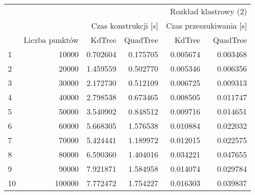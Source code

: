 \begin{tabular}{lrrrrr}
\toprule
 & \multicolumn{5}{r}{Rozkład klastrowy (2)} \\
 &  & \multicolumn{2}{r}{Czas konstrukcji [s]} & \multicolumn{2}{r}{Czas przeszukiwania [s]} \\
 & Liczba punktów & KdTree & QuadTree & KdTree & QuadTree \\
\midrule
1 & 10000 & 0.702604 & 0.175705 & 0.005674 & 0.003468 \\
2 & 20000 & 1.459559 & 0.502770 & 0.005346 & 0.006356 \\
3 & 30000 & 2.172730 & 0.512109 & 0.006725 & 0.009313 \\
4 & 40000 & 2.798538 & 0.673465 & 0.008505 & 0.011747 \\
5 & 50000 & 3.540902 & 0.848512 & 0.009716 & 0.014651 \\
6 & 60000 & 5.668305 & 1.576538 & 0.010884 & 0.022032 \\
7 & 70000 & 5.424441 & 1.189972 & 0.012015 & 0.022575 \\
8 & 80000 & 6.590360 & 1.404016 & 0.034221 & 0.047655 \\
9 & 90000 & 7.921871 & 1.584958 & 0.014074 & 0.029784 \\
10 & 100000 & 7.772472 & 1.754227 & 0.016303 & 0.039837 \\
\bottomrule
\end{tabular}
